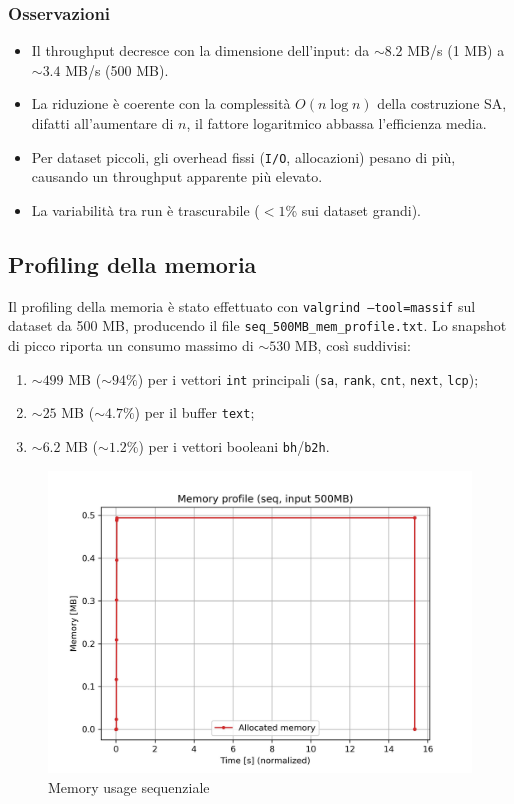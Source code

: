 			\subsubsection*{Osservazioni}
				\begin{itemize}
						\item Il throughput decresce con la dimensione dell’input: da \(\sim 8.2\) MB/s (1 MB) a \(\sim 3.4\) MB/s (500 MB).
						\item La riduzione è coerente con la complessità \(O(n \log n)\) della costruzione SA, difatti all’aumentare di \(n\), il fattore logaritmico abbassa l’efficienza media.
						\item Per dataset piccoli, gli overhead fissi (\texttt{I/O}, allocazioni) pesano di più, causando un throughput apparente più elevato.
						\item La variabilità tra run è trascurabile ($<1$\% sui dataset grandi).
				\end{itemize}
		
		\subsection{Profiling della memoria}
			Il profiling della memoria è stato effettuato con \texttt{valgrind --tool=massif} sul dataset da 500 MB, producendo il file \texttt{seq\_500MB\_mem\_profile.txt}.
			Lo snapshot di picco riporta un consumo massimo di \(\sim 530\) MB, così suddivisi:
			\begin{enumerate}
				\item \(\sim 499\) MB (\(\sim 94\%\)) per i vettori \texttt{int} principali (\texttt{sa}, \texttt{rank}, \texttt{cnt}, \texttt{next}, \texttt{lcp});
				\item \(\sim 25\) MB (\(\sim 4.7\%\)) per il buffer \texttt{text};
				\item \(\sim 6.2\) MB (\(\sim 1.2\%\)) per i vettori booleani \texttt{bh}/\texttt{b2h}.
			\end{enumerate}
			
			\begin{figure}[H]
				\centering
				\includegraphics[width=1\linewidth]{img/seq_plots/seq_memory_profile.jpg}
				\caption{Memory usage sequenziale}
				\label{fig:seq_mem_usage}
			\end{figure}
			
